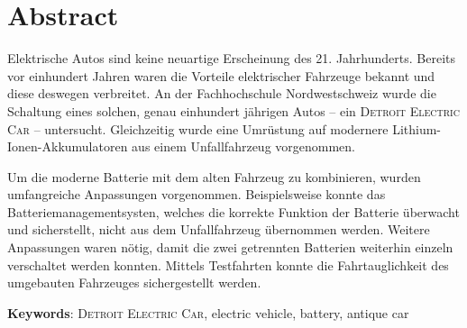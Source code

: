 \chapter*{Abstract}\color{blue}
Elektrische Autos sind keine neuartige Erscheinung des 21. Jahrhunderts. Bereits vor einhundert Jahren waren die Vorteile elektrischer Fahrzeuge bekannt und diese deswegen verbreitet. An der Fachhochschule Nordwestschweiz wurde die Schaltung eines solchen, genau einhundert jährigen Autos -- ein \textsc{Detroit Electric Car} -- untersucht. Gleichzeitig wurde eine Umrüstung auf modernere Lithium-Ionen-Akkumulatoren aus einem Unfallfahrzeug vorgenommen.

Um die moderne Batterie mit dem alten Fahrzeug zu kombinieren, wurden umfangreiche Anpassungen vorgenommen. Beispielsweise konnte das Batteriemanagementsysten, welches die korrekte Funktion der Batterie überwacht und sicherstellt, nicht aus dem Unfallfahrzeug übernommen werden. Weitere Anpassungen waren nötig, damit die zwei getrennten Batterien weiterhin einzeln verschaltet werden konnten. Mittels Testfahrten konnte die Fahrtauglichkeit des umgebauten Fahrzeuges sichergestellt werden.\color{black}

\textbf{Keywords}: \textsc{Detroit Electric Car}, electric vehicle, battery, antique car